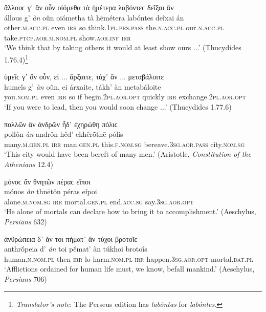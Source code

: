 \begin{exe}
\ex ἄλλουϲ γ᾽ ἂν οὖν οἰόμεθα τὰ ἡμέτερα λαβόντεϲ δεῖξαι ἄν\\
\gll állous g' \emph{àn} oûn oiómetha tà hēmétera labóntes deîxai án\\
other.\textsc{m.acc.pl} even \textsc{irr} so think.\textsc{1pl.prs.pass} the.\textsc{n.acc.pl} our.\textsc{n.acc.pl} take.\textsc{ptcp.aor.m.nom.pl} show.\textsc{aor.inf} \textsc{irr}\\
\trans `We think that by taking others it would at least show ours ...' (Thucydides 1.76.4)\footnote{\emph{Translator's note}: The Perseus edition has \textit{labóntas} for \textit{labóntes}.}
\label{ganoun1}
\end{exe}

\begin{exe}
\ex ὑμεῖϲ γ᾽ ἂν οὖν, εἰ ... ἄρξαιτε, τάχ᾽ ἂν ... μεταβάλοιτε\\
\gll humeîs g' \emph{àn} oûn, ei árxaite, tákh' àn metabáloite\\
you.\textsc{nom.pl} even \textsc{irr} so if begin.\textsc{2pl.aor.opt} quickly \textsc{irr} exchange.\textsc{2pl.aor.opt}\\
\trans `If you were to lead, then you would soon change ...' (Thucydides 1.77.6)
\label{ganoun2}
\end{exe}

\begin{exe}
\ex πολλῶν ἂν ἀνδρῶν ἧδ᾽ ἐχηρώθη πόλιϲ\\
\gll pollôn \emph{àn} andrôn hêd' ekhērṓthē pólis\\
many.\textsc{m.gen.pl} \textsc{irr} man.\textsc{gen.pl} this.\textsc{f.nom.sg} bereave.\textsc{3sg.aor.pass} city.\textsc{nom.sg}\\
\trans `This city would have been bereft of many men.' (Aristotle, \textit{Constitution of the Athenians} 12.4)
\label{wordgroup1}
\end{exe}

\begin{exe}
\ex μόνοϲ ἂν θνητῶν πέραϲ εἴποι\\
\gll mónos \emph{àn} thnētôn péras eípoi\\
alone.\textsc{m.nom.sg} \textsc{irr} mortal.\textsc{gen.pl} end.\textsc{acc.sg} say.\textsc{3sg.aor.opt}\\
\trans `He alone of mortals can declare how to bring it to accomplishment.' (Aeschylus, \textit{Persians} 632)
\label{wordgroup2}
\end{exe}

\begin{exe}
\ex ἀνθρώπεια δ᾽ ἄν τοι πήματ᾽ ἂν τύχοι βροτοῖϲ\\
\gll anthrṓpeia d' \emph{án} toi pḗmat' àn túkhoi brotoîs\\
human.\textsc{n.nom.pl} then \textsc{irr} lo harm.\textsc{nom.pl} \textsc{irr} happen.\textsc{3sg.aor.opt} mortal.\textsc{dat.pl}\\
\trans `Afflictions ordained for human life must, we know, befall mankind.' (Aeschylus, \textit{Persians} 706)
\label{wordgroup3}
\end{exe}

